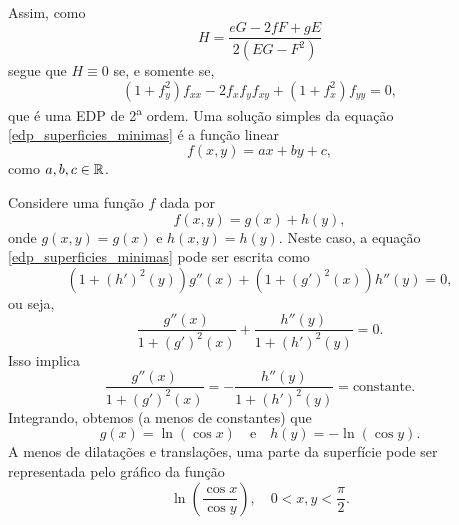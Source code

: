 \begin{exemplo}
\begin{align*}
	\end{align*}
	Assim, como
	\begin{equation*}
	H = \frac{eG - 2fF + gE}{2(EG - F^2)}
	\end{equation*}
	segue que $H \equiv 0$ se, e somente se,
	\begin{equation}\label{edp_superficies_minimas}
	(1 + f_y^2) f_{xx}  - 2 f_x f_y f_{xy} + (1+f_x^2) f_{yy} = 0,
	\end{equation}
	que é uma EDP de 2\textsuperscript{a} ordem.
	Uma solução simples da equação \eqref{edp_superficies_minimas} é a função linear
	\begin{equation*}
	f(x,y) = ax + by + c,
	\end{equation*}
	como $a, b, c \in \mathbb{R}$.
\end{exemplo}

\begin{exemplo}
	Considere uma função $f$ dada por
	\begin{equation*}
	f(x,y) = g(x) + h(y),
	\end{equation*}
	onde  $g(x,y)=g(x)$ e $h(x,y)=h(y)$. Neste caso, a equação \eqref{edp_superficies_minimas} pode ser escrita como
	\begin{equation*}
	(1 + (h')^2(y)) g''(x) + (1 + (g')^2(x)) h''(y) = 0,
	\end{equation*}
	ou seja,
	\begin{equation*}
	\frac{g''(x)}{1 + (g')^2(x)} + \frac{h''(y)}{1 + (h')^2(y)} = 0.
	\end{equation*}
	Isso implica
	\begin{equation*}
	\frac{g''(x)}{1 + (g')^2(x)} = - \frac{h''(y)}{1 + (h')^2(y)} = \text{constante}.
	\end{equation*}
	Integrando, obtemos (a menos de constantes) que
	\begin{equation*}
	g(x) = \ln (\cos x) \quad \text{e} \quad h(y) = -\ln (\cos y).
	\end{equation*}
	A menos de dilatações e translações, uma parte da superfície pode ser representada pelo gráfico da função
	\begin{equation*}
	\ln \left( \frac{\cos x}{\cos y} \right), \quad 0 < x,y < \frac{\pi}{2}.
	\end{equation*}
\end{exemplo}

